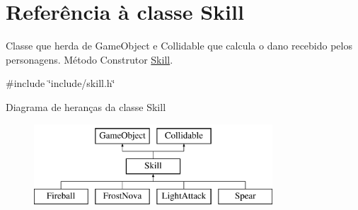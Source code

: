 \hypertarget{classSkill}{}\section{Referência à classe Skill}
\label{classSkill}


Classe que herda de Game\+Object e Collidable que calcula o dano recebido pelos personagens.  Método Construtor \mbox{\hyperlink{classSkill}{Skill}}.  




{\ttfamily \#include \char`\"{}include/skill.\+h\char`\"{}}

Diagrama de heranças da classe Skill\begin{figure}[H]
\begin{center}
\leavevmode
\includegraphics[height=3.000000cm]{classSkill}
\end{center}
\end{figure}
